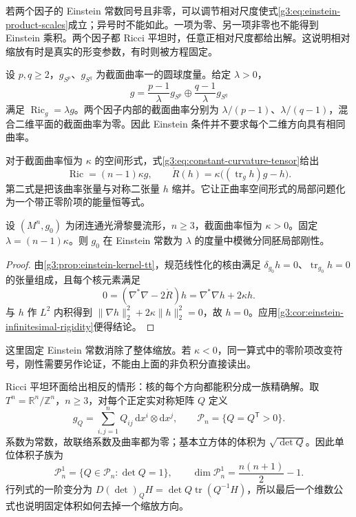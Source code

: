 若两个因子的 Einstein 常数同号且非零，可以调节相对尺度使式\eqref{g3:eq:einstein-product-scales}成立；异号时不能如此。一项为零、另一项非零也不能得到 Einstein 乘积。两个因子都 Ricci 平坦时，任意正相对尺度都给出解。这说明相对缩放有时是真实的形变参数，有时则被方程固定。

\begin{example}\label{g3:exm:einstein-sphere-product}
	设 \(p,q\ge2\)，\(g_{S^p}\)、\(g_{S^q}\) 为截面曲率一的圆球度量。给定 \(\lambda>0\)，
	\[
		g=\frac{p-1}{\lambda}g_{S^p}
		\oplus\frac{q-1}{\lambda}g_{S^q}
	\]
	满足 \(\operatorname{Ric}_g=\lambda g\)。两个因子内部的截面曲率分别为 \(\lambda/(p-1)\)、\(\lambda/(q-1)\)，混合二维平面的截面曲率为零。因此 Einstein 条件并不要求每个二维方向具有相同曲率。
\end{example}

对于截面曲率恒为 \(\kappa\) 的空间形式，式\eqref{g3:eq:constant-curvature-tensor}给出
\[
	\operatorname{Ric}=(n-1)\kappa g,
	\qquad
	\mathring R(h)=\kappa\bigl((\operatorname{tr}_g h)g-h\bigr).
\]
第二式是把该曲率张量与对称二张量 \(h\) 缩并。它让正曲率空间形式的局部问题化为一个带正零阶项的能量恒等式。

\begin{corollary}\label{g3:cor:positive-space-form-einstein-rigid}
	设 \((M^n,g_0)\) 为闭连通光滑黎曼流形，\(n\ge3\)，截面曲率恒为 \(\kappa>0\)。固定 \(\lambda=(n-1)\kappa\)。则 \(g_0\) 在 Einstein 常数为 \(\lambda\) 的度量中模微分同胚局部刚性。
\end{corollary}
\begin{proof}
	由\cref{g3:prop:einstein-kernel-tt}，规范线性化的核由满足 \(\delta_{g_0}h=0\)、\(\operatorname{tr}_{g_0}h=0\) 的张量组成，且每个核元素满足
	\[
		0=(\nabla^*\nabla-2\mathring R)h
		=\nabla^*\nabla h+2\kappa h.
	\]
	与 \(h\) 作 \(L^2\) 内积得到 \(\|\nabla h\|_2^2+2\kappa\|h\|_2^2=0\)，故 \(h=0\)。应用\cref{g3:cor:einstein-infinitesimal-rigidity}便得结论。
\end{proof}

这里固定 Einstein 常数消除了整体缩放。若 \(\kappa<0\)，同一算式中的零阶项改变符号，刚性需要另作论证，不能由上面的非负积分直接读出。

\ProseParagraphBreak

Ricci 平坦环面给出相反的情形：核的每个方向都能积分成一族精确解。取 \(T^n=\mathbb R^n/\mathbb Z^n\)，\(n\ge3\)，对每个正定实对称矩阵 \(Q\) 定义
\begin{equation}\label{g3:eq:flat-torus-matrix-metric}
	g_Q=\sum_{i,j=1}^nQ_{ij}\,\mathrm dx^i\otimes\mathrm dx^j,
	\qquad \mathcal P_n=\{Q=Q^{\mathsf T}>0\}.
\end{equation}
系数为常数，故联络系数及曲率都为零；基本立方体的体积为 \(\sqrt{\det Q}\)。因此单位体积子族为
\[
	\mathcal P_n^1=\{Q\in\mathcal P_n:\det Q=1\},
	\qquad \dim\mathcal P_n^1=\frac{n(n+1)}2-1.
\]
行列式的一阶变分为 \(D(\det)_QH=\det Q\operatorname{tr}(Q^{-1}H)\)，所以最后一个维数公式也说明固定体积如何去掉一个缩放方向。

